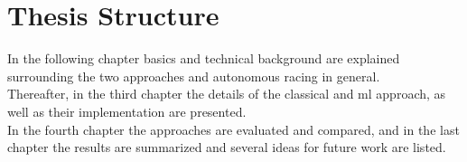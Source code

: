 \section{Thesis Structure}
In the following chapter basics and technical background are explained surrounding the two approaches and autonomous racing in general.\\
Thereafter, in the third chapter the details of the classical and \ac{ml} approach, as well as their implementation are presented.\\
In the fourth chapter the approaches are evaluated and compared,
and in the last chapter the results are summarized and several ideas for future work are listed.

